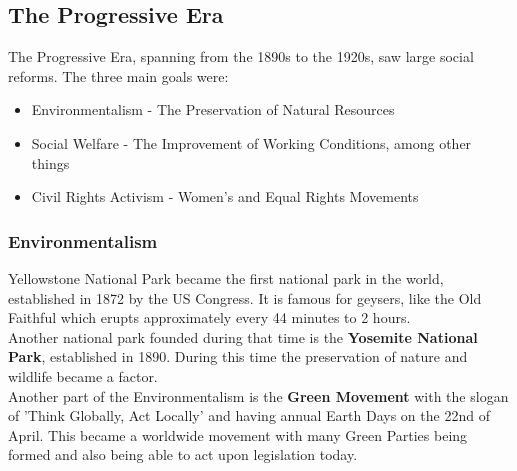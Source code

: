 \documentclass{article}
\begin{document}
	\subsection{The Progressive Era}
	The Progressive Era, spanning from the 1890s to the 1920s, saw large social reforms. The three main goals were:
	\begin{itemize}
		\item{Environmentalism - The Preservation of Natural Resources}
		\item{Social Welfare - The Improvement of Working Conditions, among other things}
		\item{Civil Rights Activism - Women's and Equal Rights Movements}
	\end{itemize}
	\subsubsection{Environmentalism}
	Yellowstone National Park became the first national park in the world, established in 1872 by the US Congress. It is famous for geysers, like the Old Faithful which erupts approximately every 44 minutes to 2 hours. \\
	Another national park founded during that time is the \textbf{Yosemite National Park}, established in 1890. During this time the preservation of nature and wildlife became a factor. \\
	Another part of the Environmentalism is the \textbf{Green Movement} with the slogan of 'Think Globally, Act Locally' and having annual Earth Days on the 22nd of April. This became a worldwide movement with many Green Parties being formed and also being able to act upon legislation today.
\end{document}
